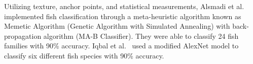 \documentclass[conference]{IEEEtran}
\begin{document}
Utilizing texture, anchor points, and statistical measurements,
Alsmadi et al.~\cite{Alsmadi2019RFE} implemented fish
classification through a meta-heuristic algorithm known as Memetic Algorithm (Genetic Algorithm with Simulated Annealing) with back-propagation algorithm (MA-B Classifier). They were able to classify 24 fish families with 90\%
accuracy.
Iqbal et al.~\cite{Iqbal2021AutomaticFS} used a modified
AlexNet \cite{AlexNet2012} model to classify six different fish species
with 90\% accuracy.
\end{document}
